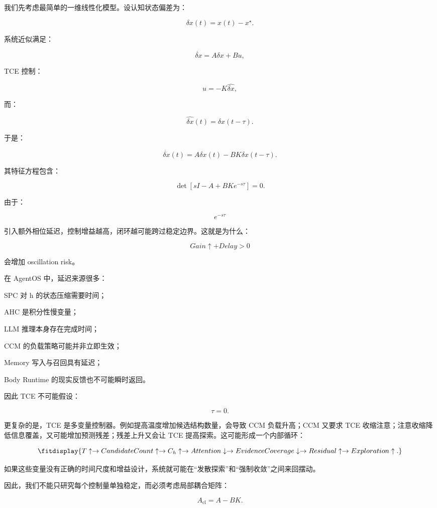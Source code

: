 我们先考虑最简单的一维线性化模型。设认知状态偏差为：

\[
\delta x(t)=x(t)-x^\star.
\]

系统近似满足：

\[
\dot{\delta x}
=
A\delta x
+
Bu,
\]

TCE 控制：

\[
u=-K\hat{\delta x},
\]

而：

\[
\hat{\delta x}(t)
=
\delta x(t-\tau).
\]

于是：

\[
\dot{\delta x}(t)
=
A\delta x(t)
-
BK\delta x(t-\tau).
\]

其特征方程包含：

\[
\det
\left[
sI-A+BKe^{-s\tau}
\right]
=0.
\]

由于：

\[
e^{-s\tau}
\]

引入额外相位延迟，控制增益越高，闭环越可能跨过稳定边界。这就是为什么：

\[
Gain\uparrow
+
Delay>0
\]

会增加 oscillation risk。

在 AgentOS 中，延迟来源很多：

SPC 对 h 的状态压缩需要时间；

AHC 是积分性慢变量；

LLM 推理本身存在完成时间；

CCM 的负载策略可能并非立即生效；

Memory 写入与召回具有延迟；

Body Runtime 的现实反馈也不可能瞬时返回。

因此 TCE 不可能假设：

\[
\tau=0.
\]

更复杂的是，TCE 是多变量控制器。例如提高温度增加候选结构数量，会导致 CCM 负载升高；CCM 又要求 TCE 收缩注意；注意收缩降低信息覆盖，又可能增加预测残差；残差上升又会让 TCE 提高探索。这可能形成一个内部循环：

\[
\fitdisplay{
T\uparrow
\rightarrow
CandidateCount\uparrow
\rightarrow
C_h\uparrow
\rightarrow
Attention\downarrow
\rightarrow
EvidenceCoverage\downarrow
\rightarrow
Residual\uparrow
\rightarrow
Exploration\uparrow.
}
\]

如果这些变量没有正确的时间尺度和增益设计，系统就可能在“发散探索”和“强制收敛”之间来回摆动。

因此，我们不能只研究每个控制量单独稳定，而必须考虑局部耦合矩阵：

\[
A_{\mathrm{cl}}
=
A-BK.
\]

